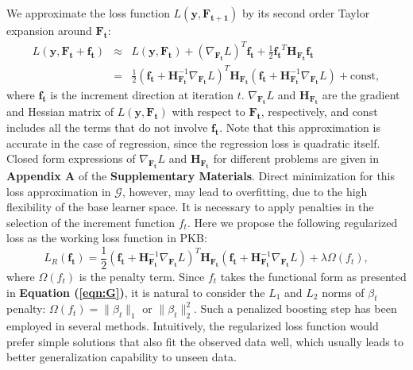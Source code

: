 \documentclass[a4paper,12pt]{article}
\newcommand{\bd}[1]{\mathbf{#1}}
\newcommand{\grad}[2]{\nabla_{\bd{#2}} #1}
\newcommand{\hess}[1]{\bd{H}_{\bd{#1}}}
\begin{document}
 We approximate the loss function $L(\bd{y},\bd{F_{t+1}})$ by its second order Taylor expansion around $\bd{F_t}$:
	\begin{eqnarray*}
		L(\bd{y}, \bd{F_t} + \bd{f_t}) &\approx& L(\bd{y}, \bd{F_t}) +  (\grad{L}{F_t})^T \bd{f_t} + \frac{1}{2}\bd{f_t}^T \hess{F_t} \bd{f_t} \\
		& = & \frac{1}{2} (\bd{f_t} + \hess{F_t}^{-1} \grad{L}{F_t})^T \hess{F_t} (\bd{f_t} + \hess{F_t}^{-1} \grad{L}{F_t}) + \mbox{const},
	\end{eqnarray*}
where $\bd{f_t}$ is the increment direction at iteration $t$. $\nabla_{\bd{F_t}} L$ and $\bd{H}_{\bd{F_t}}$ are the gradient and Hessian matrix of $L(\bd{y}, \bd{F_t})$ with respect to $\bd{F_t}$, respectively, and const includes all the terms that do not involve $\bd{f_t}$. Note that this approximation is accurate in the case of regression, since the regression loss is quadratic itself. Closed form expressions of $\grad{L}{F_t}$ and $\hess{F_t}$ for different problems are given in \textbf{Appendix A} of the \textbf{Supplementary Materials}. Direct minimization for this loss approximation in $\mathcal{G}$, however, may lead to overfitting, due to the high flexibility of the base learner space. It is necessary to apply penalties in the selection of the increment function  $f_t$. Here we propose the following regularized loss as the working loss function in PKB:
$$L_{R}(\bd{f_t}) = \frac{1}{2} (\bd{f_t} + \hess{F_t}^{-1} \grad{L}{F_t})^T \hess{F_t} (\bd{f_t} + \hess{F_t}^{-1} \grad{L}{F_t}) + \lambda \Omega({f_t}),$$
where $\Omega({f_t})$ is the penalty term. Since ${f_t}$ takes the functional form as presented in \textbf{Equation (\ref{eqn:G})}, it is natural to consider the  $L_1$ and $L_2$ norms of $\beta_t$ penalty: $\Omega({f_t}) = \| \beta_t \|_1$ or $\| \beta_t \|_2^2$. Such a penalized boosting step has been employed in several methods. \cite{johnson2014learning} Intuitively, the regularized loss function would prefer simple solutions that also fit the observed data well, which usually leads to better generalization capability to unseen data.
\end{document}
